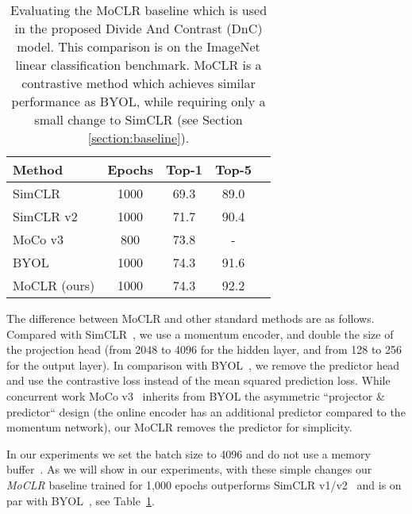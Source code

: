 \documentclass[final]{cvpr}
\newcommand\baseline{MoCLR}
\begin{document}
\begin{table}[t]
\caption{Evaluating the \baseline{} baseline which is used in the proposed Divide And Contrast (DnC) model. This comparison is on the ImageNet linear classification benchmark. \baseline{} is a contrastive method which achieves similar performance as BYOL, while requiring only a small change to SimCLR (see Section \ref{section:baseline}).}
\label{tab:linear_baseline}
\begin{center}
\begin{small}
\begin{tabular}{lcccc}
\toprule
Method & Epochs & Top-1 & Top-5 \\
\midrule 
SimCLR \cite{chen2020simple} & 1000 & 69.3 & 89.0 \\
SimCLR v2 \cite{chen2020big} & 1000 & 71.7 & 90.4 \\
MoCo v3 \cite{chen2021empirical} & 800 & 73.8 & - \\
BYOL \cite{grill2020bootstrap} & 1000 & 74.3 & 91.6 \\
\baseline{} (ours) & 1000 & 74.3 & 92.2  \\ 
\bottomrule
\end{tabular}
\end{small}
\end{center}
\end{table}

The difference between \baseline{} and other standard methods are as follows. Compared with SimCLR~\cite{chen2020simple}, we use a momentum encoder, and double the size of the projection head (from 2048 to 4096 for the hidden layer, and from 128 to 256 for the output layer). In comparison with BYOL~\cite{grill2020bootstrap}, we remove the predictor head and use the contrastive loss instead of the mean squared prediction loss. While concurrent work MoCo v3~\cite{chen2021empirical} inherits from BYOL the asymmetric ``projector \& predictor`` design (the online encoder has an additional predictor compared to the momentum network), our MoCLR removes the predictor for simplicity.

In our experiments we set the batch size to 4096 and do not use a memory buffer~\cite{wu2018unsupervised,tian2019contrastive,he2020momentum}. As we will show in our experiments, with these simple changes our \emph{\baseline{}} baseline trained for 1,000 epochs outperforms SimCLR v1/v2~\cite{chen2020big} and is on par with BYOL~\cite{grill2020bootstrap}, see Table~\ref{tab:linear_baseline}. 
\end{document}
